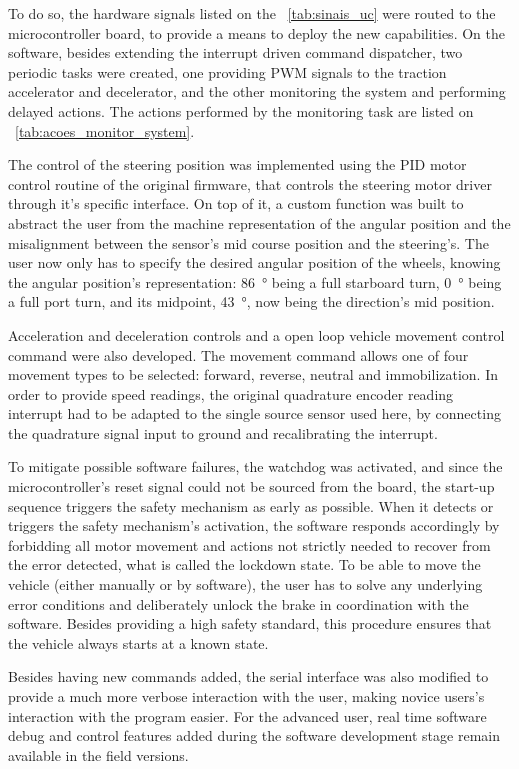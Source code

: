 \documentclass[journal]{IEEEtran}
\begin{document}
To do so, the hardware signals listed on the \tablename~\ref{tab:sinais_uc} were routed to the microcontroller board, to provide a means to deploy the new capabilities. On the software, besides extending the interrupt driven command dispatcher, two periodic tasks were created, one providing \ac{PWM} signals to the traction accelerator and decelerator, and the other monitoring the system and performing delayed actions. The actions performed by the monitoring task are listed on \tablename~\ref{tab:acoes_monitor_system}.

The control of the steering position was implemented using the \ac{PID} motor control routine of the original firmware, that controls the steering motor driver through it's specific interface. On top of it, a custom function was built to abstract the user from the machine representation of the angular position and the misalignment between the sensor's mid course position and the steering's. The user now only has to specify the desired angular position of the wheels, knowing the angular position's representation: \SI{86}{\degree} being a full starboard turn, \SI{0}{\degree} being a full port turn, and its midpoint, \SI{43}{\degree}, now being the direction's mid position.

Acceleration and deceleration controls and a open loop vehicle movement control command were also developed. The movement command allows one of four movement types to be selected: forward, reverse, neutral and immobilization. In order to provide speed readings, the original quadrature encoder reading interrupt had to be adapted to the single source sensor used here, by connecting the quadrature signal input to ground and recalibrating the interrupt.

To mitigate possible software failures, the watchdog was activated, and since the microcontroller's reset signal could not be sourced from the board, the start-up sequence triggers the safety mechanism as early as possible. When it detects or triggers the safety mechanism's activation, the software responds accordingly by forbidding all motor movement and actions not strictly needed to recover from the error detected, what is called the lockdown state. To be able to move the vehicle (either manually or by software), the user has to solve any underlying error conditions and deliberately unlock the brake in coordination with the software. Besides providing a high safety standard, this procedure ensures that the vehicle always starts at a known state.

Besides having new commands added, the serial interface was also modified to provide a much more verbose interaction with the user, making novice users's interaction with the program easier. For the advanced user, real time software debug and control features added during the software development stage remain available in the field versions.
\end{document}
